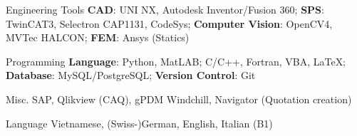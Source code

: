 

\begin{cvskills}


  \cvskill
    {Engineering Tools} %
    {\textbf{CAD}: UNI NX, Autodesk Inventor/Fusion 360; 
    \newline \textbf{SPS}: TwinCAT3, Selectron CAP1131, CodeSys;
    \newline \textbf{Computer Vision}: OpenCV4, MVTec HALCON;
  \newline \textbf{FEM}: Ansys (Statics)} %

%

  \cvskill
    {Programming} %
    {\textbf{Language}: Python, MatLAB; C/C++, Fortran, VBA, LaTeX; 
      \newline \textbf{Database}: MySQL/PostgreSQL;
      \newline \textbf{Version Control}: Git
      } %

  \cvskill
    {Misc.} %
    {SAP, Qlikview (CAQ), gPDM Windchill, Navigator (Quotation creation)} %

  \cvskill
    {Language} %
    {Vietnamese, (Swiss-)German, English, Italian (B1)} %

\end{cvskills}

